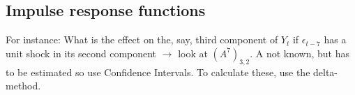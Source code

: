 \subsection{Impulse response functions}
For instance: What is the effect on the, say, third component of $Y_t$ if $\epsilon_{t-7}$ has a unit shock in its second component $\rightarrow$ look at $(A^7)_{3,2}$.
A not known, but has to be estimated so use Confidence Intervals. To calculate these, use the delta-method.